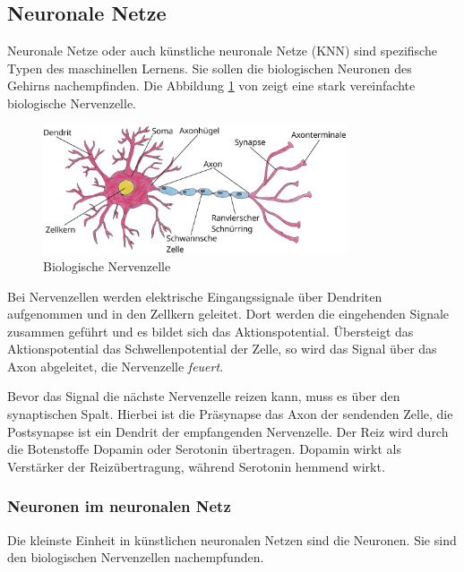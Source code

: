 

\subsection{Neuronale Netze}
Neuronale Netze oder auch künstliche neuronale Netze (\acrshort{KNN}) sind spezifische Typen des maschinellen Lernens. Sie sollen die biologischen Neuronen des Gehirns nachempfinden. Die Abbildung \ref{img:biological_neuron} von \cite{pahl-2024} zeigt eine stark vereinfachte biologische Nervenzelle.

\begin{figure}[!ht]
	\includegraphics[width=0.8\textwidth]{content/chapter_basics/images/biological_neuron.eps}
	\centering
	\caption{Biologische Nervenzelle}
	\label{img:biological_neuron}
\end{figure}

Bei Nervenzellen werden elektrische Eingangssignale über Dendriten aufgenommen und in den Zellkern geleitet. Dort werden die eingehenden Signale zusammen geführt und es bildet sich das Aktionspotential. Übersteigt das Aktionspotential das Schwellenpotential der Zelle, so wird das Signal über das Axon abgeleitet, die Nervenzelle \glqq \textit{feuert}\grqq.\vspace{0.2cm}

Bevor das Signal die nächste Nervenzelle reizen kann, muss es über den synaptischen Spalt. Hierbei ist die Präsynapse das Axon der sendenden Zelle, die Postsynapse ist ein Dendrit der empfangenden Nervenzelle. Der Reiz wird durch die Botenstoffe Dopamin oder Serotonin übertragen. Dopamin wirkt als Verstärker der Reizübertragung, während Serotonin hemmend wirkt.

\subsubsection{Neuronen im neuronalen Netz}
Die kleinste Einheit in künstlichen neuronalen Netzen sind die Neuronen. Sie sind den biologischen Nervenzellen nachempfunden. \vspace{0.2cm}

